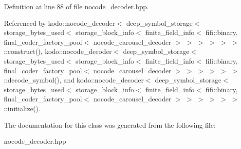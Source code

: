 Definition at line 88 of file nocode\-\_\-decoder.\-hpp.



Referenced by kodo\-::nocode\-\_\-decoder$<$ deep\-\_\-symbol\-\_\-storage$<$ storage\-\_\-bytes\-\_\-used$<$ storage\-\_\-block\-\_\-info$<$ finite\-\_\-field\-\_\-info$<$ fifi\-::binary, final\-\_\-coder\-\_\-factory\-\_\-pool$<$ nocode\-\_\-carousel\-\_\-decoder $>$ $>$ $>$ $>$ $>$ $>$\-::construct(), kodo\-::nocode\-\_\-decoder$<$ deep\-\_\-symbol\-\_\-storage$<$ storage\-\_\-bytes\-\_\-used$<$ storage\-\_\-block\-\_\-info$<$ finite\-\_\-field\-\_\-info$<$ fifi\-::binary, final\-\_\-coder\-\_\-factory\-\_\-pool$<$ nocode\-\_\-carousel\-\_\-decoder $>$ $>$ $>$ $>$ $>$ $>$\-::decode\-\_\-symbol(), and kodo\-::nocode\-\_\-decoder$<$ deep\-\_\-symbol\-\_\-storage$<$ storage\-\_\-bytes\-\_\-used$<$ storage\-\_\-block\-\_\-info$<$ finite\-\_\-field\-\_\-info$<$ fifi\-::binary, final\-\_\-coder\-\_\-factory\-\_\-pool$<$ nocode\-\_\-carousel\-\_\-decoder $>$ $>$ $>$ $>$ $>$ $>$\-::initialize().



The documentation for this class was generated from the following file\-:\begin{DoxyCompactItemize}
\item 
nocode\-\_\-decoder.\-hpp\end{DoxyCompactItemize}
